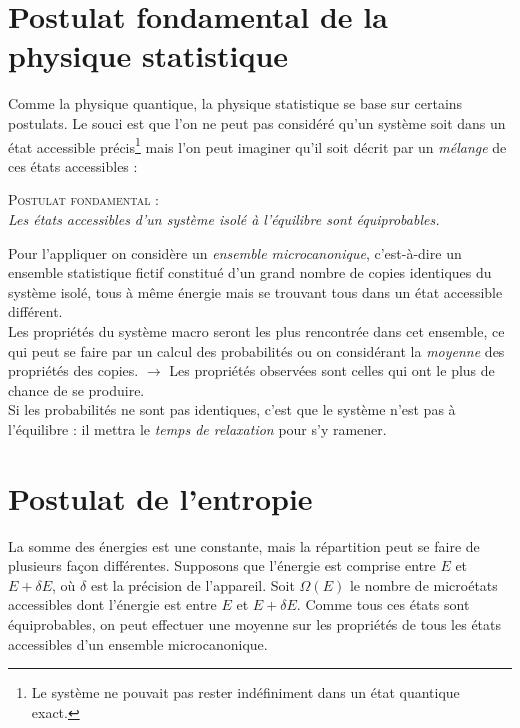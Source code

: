 \documentclass	[11pt, a4paper, openany]{book}
\begin{document}
		\section{Postulat fondamental de la physique statistique}
		Comme la physique quantique, la physique statistique se base sur certains postulats. Le souci est 
		que l'on ne peut pas considéré qu'un système soit dans un état accessible précis\footnote{Le système
		ne pouvait pas rester indéfiniment dans un état quantique exact.} mais l'on peut imaginer qu'il soit 
		décrit par un \textit{mélange} de ces états accessibles :
		\begin{center}
			\textsc{Postulat fondamental} :\\
			\textit{Les états accessibles d'un système isolé à l'équilibre sont équiprobables.}
		\end{center}
		Pour l'appliquer on considère un \textit{ensemble microcanonique}, c'est-à-dire un ensemble statistique
		fictif constitué d'un grand nombre de copies identiques du système isolé, tous à même énergie mais se 
		trouvant tous dans un état accessible différent.\\
		Les propriétés du système macro seront les plus rencontrée dans cet ensemble, ce qui peut se
		faire par un calcul des probabilités ou on considérant la \textit{moyenne} des propriétés des copies.
		$\rightarrow$ Les propriétés observées sont celles qui ont le plus de chance de se produire.\\
		Si les probabilités ne sont pas identiques, c'est que le système n'est pas à l'équilibre : il mettra le 
		\textit{temps de relaxation} pour s'y ramener.
		
		
		\section{Postulat de l'entropie}
		La somme des énergies est une constante, mais la répartition peut se faire de plusieurs façon 
		différentes. Supposons que l'énergie est comprise entre $E$ et $E+\delta E$, où $\delta$ est la
		précision de l'appareil. Soit $\Omega(E)$ le nombre de microétats accessibles dont l'énergie est
		entre $E$ et $E+\delta E$. Comme tous ces états sont équiprobables, on peut effectuer une moyenne
		sur les propriétés de tous les états accessibles d'un ensemble microcanonique.\\
		
\end{document}
